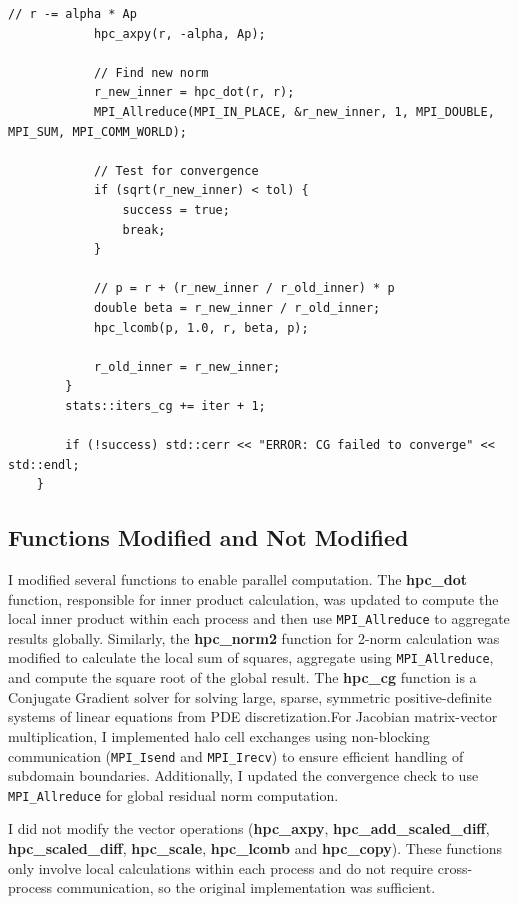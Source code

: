 \documentclass[unicode,11pt,a4paper,oneside,numbers=endperiod,openany]{scrartcl}
\begin{document}
\begin{lstlisting}[style=mystyle, language=MyC++, caption={Implementation of \texttt{hpc\_cg} for Conjugate Gradient Method}]
            // r -= alpha * Ap
            hpc_axpy(r, -alpha, Ap);
    
            // Find new norm
            r_new_inner = hpc_dot(r, r);
            MPI_Allreduce(MPI_IN_PLACE, &r_new_inner, 1, MPI_DOUBLE, MPI_SUM, MPI_COMM_WORLD);
    
            // Test for convergence
            if (sqrt(r_new_inner) < tol) {
                success = true;
                break;
            }
    
            // p = r + (r_new_inner / r_old_inner) * p
            double beta = r_new_inner / r_old_inner;
            hpc_lcomb(p, 1.0, r, beta, p);
    
            r_old_inner = r_new_inner;
        }
        stats::iters_cg += iter + 1;
    
        if (!success) std::cerr << "ERROR: CG failed to converge" << std::endl;
    }
\end{lstlisting}

\subsection{Functions Modified and Not Modified}

I modified several functions to enable parallel computation. The \textbf{hpc\_dot} function, responsible for inner product calculation, was updated to compute the local inner product within each process and then use \texttt{MPI\_Allreduce} to aggregate results globally. Similarly, the \textbf{hpc\_norm2} function for 2-norm calculation was modified to calculate the local sum of squares, aggregate using \texttt{MPI\_Allreduce}, and compute the square root of the global result. The \textbf{hpc\_cg} function is a Conjugate Gradient solver for solving large, sparse, symmetric positive-definite systems of linear equations from PDE discretization.For Jacobian matrix-vector multiplication, I implemented halo cell exchanges using non-blocking communication (\texttt{MPI\_Isend} and \texttt{MPI\_Irecv}) to ensure efficient handling of subdomain boundaries. Additionally, I updated the convergence check to use \texttt{MPI\_Allreduce} for global residual norm computation.

I did not modify the vector operations (\textbf{hpc\_axpy}, \textbf{hpc\_add\_scaled\_diff}, \textbf{hpc\_scaled\_diff}, \textbf{hpc\_scale}, \textbf{hpc\_lcomb} and \textbf{hpc\_copy}). These functions only involve local calculations within each process and do not require cross-process communication, so the original implementation was sufficient.
\end{document}
